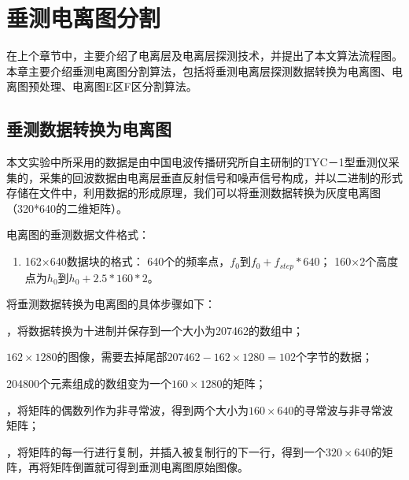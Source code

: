 \chapter{垂测电离图分割}
\label{cha3}
在上个章节中，主要介绍了电离层及电离层探测技术，并提出了本文算法流程图。本章主要介绍垂测电离图分割算法，包括将垂测电离层探测数据转换为电离图、电离图预处理、电离图E区F区分割算法。

\section{垂测数据转换为电离图}
\label{3_1}

本文实验中所采用的数据是由中国电波传播研究所自主研制的TYC－1型垂测仪采集的，采集的回波数据由电离层垂直反射信号和噪声信号构成，并以二进制的形式存储在文件中，利用数据的形成原理，我们可以将垂测数据转换为灰度电离图（320*640的二维矩阵）。
       
电离图的垂测数据文件格式：
\begin{enumerate} 
：文件名：yyyymmddHHMMp30s1.0h0.0V.O，文件名中的yyyy表示数据的采集年份、mm表示数据的采集月份、dd表示数据的采集日、HH表示数据的采集小时、MM表示数据的采集分钟，p后的数据表示频率步长$f_{step}$（KHz），s后的数据表示初始频率$f_{0}$(MHz)，h后的数据表示起始高度$h_{0}$(km)。高度固定步长为2.5km。例如201110191400p35s1.0h0.0V.O表示2011年10月19日14时00分以初始频率为1MHz、步长为35KHz 采集的电离层二进制数据。

：302k＝162×640+100000（字节）
         
\item162×640数据块的格式： 640个的频率点，$f_{0}$到$f_{0}+f_{step}*640$； 160×2个高度点为$h_{0}$到$h_{0}+2.5*160*2$。
\end{enumerate}   
 
将垂测数据转换为电离图的具体步骤如下：
 
\begin{enumerate}         
，将数据转换为十进制并保存到一个大小为207462的数组中；
         
$162\times1280$的图像，需要去掉尾部$207462-162\times1280=102$个字节的数据；
         
204800个元素组成的数组变为一个$160\times1280$的矩阵；
         
，将矩阵的偶数列作为非寻常波，得到两个大小为$160\times640$的寻常波与非寻常波矩阵；
         
，将矩阵的每一行进行复制，并插入被复制行的下一行，得到一个$320\times640$的矩阵，再将矩阵倒置就可得到垂测电离图原始图像。
\end{enumerate}  
        
